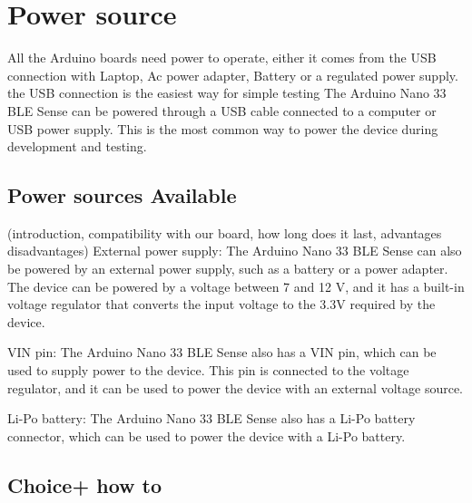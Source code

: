%
%

\chapter{Power source}

All the Arduino boards need power to operate, either it comes from the USB connection with Laptop, Ac power adapter, Battery or a regulated power supply. \\
the USB connection is the easiest way for simple testing The Arduino Nano 33 BLE Sense can be powered through a USB cable connected to a computer or USB power supply. This is the most common way to power the device during development and testing.
\section{Power sources Available}

(introduction, compatibility with our board, how long does it last, advantages disadvantages)
External power supply: The Arduino Nano 33 BLE Sense can also be powered by an external power supply, such as a battery or a power adapter. The device can be powered by a voltage between 7 and 12 V, and it has a built-in voltage regulator that converts the input voltage to the 3.3V required by the device.

VIN pin: The Arduino Nano 33 BLE Sense also has a VIN pin, which can be used to supply power to the device. This pin is connected to the voltage regulator, and it can be used to power the device with an external voltage source.

Li-Po battery: The Arduino Nano 33 BLE Sense also has a Li-Po battery connector, which can be used to power the device with a Li-Po battery.
\section{Choice+ how to}

